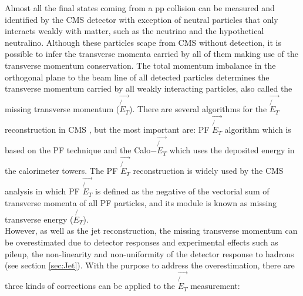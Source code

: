 Almost all the final states coming from a pp collision 
can be measured and identified by the CMS detector with exception 
of neutral particles that only interacts weakly with matter, such as 
the neutrino and the hypothetical neutralino. Although these particles 
scape from CMS without detection, it is possible to infer the 
transverse momenta carried by all of them making use of the 
transverse momentum conservation. The total momentum imbalance in the orthogonal 
plane to the beam line of all detected particles determines the transverse
momentum carried by all weakly interacting particles, also called 
the missing transverse momentum ($\vec{\not{E}_{T}}$). There are several algorithms for 
the $\vec{\not{E}_{T}}$ reconstruction in CMS \cite{Chatrchyan:2011tn}, 
but the most important are: PF $\vec{\not{E}_{T}}$ algorithm which is based on the PF technique 
and the Calo$-\vec{\not{E}_{T}}$ which uses the deposited energy in the calorimeter towers.
The PF $\vec{\not{E}_{T}}$ reconstruction is widely used by the CMS analysis in which PF 
$\vec{\not{E}_{T}}$ is defined as the negative of the vectorial 
sum of transverse momenta of all PF particles, and its module is 
known as missing transverse energy ($\not{E_{T}}$).\\

However, as well as the jet reconstruction, the missing transverse momentum
can be overestimated due to detector responses and experimental effects such 
as pileup, the non-linearity and non-uniformity of the detector response to 
hadrons (see section \ref{sec:Jet}). With the purpose to address the overestimation, 
there are three kinds of corrections can be applied to the $\vec{\not{E}_{T}}$ 
measurement:

